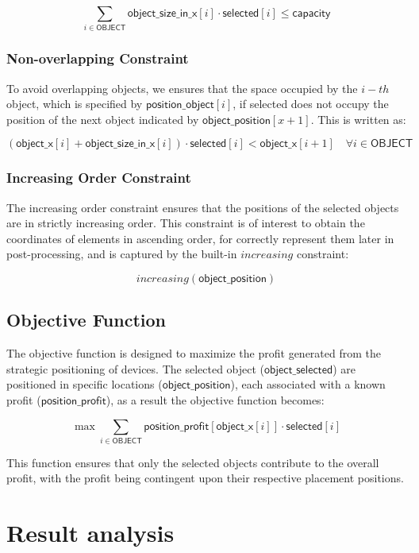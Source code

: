\documentclass[runningheads]{llncs}
\begin{document}
\[
\sum_{i \in \mathsf{OBJECT}} \mathsf{object\_size\_in\_x}[i] \cdot \mathsf{selected}[i] \leq \mathsf{capacity}
\]

\subsubsection{Non-overlapping Constraint} To avoid overlapping objects, we ensures that the space occupied by the \(i-th\) object, which is specified by \(\mathsf{position\_object}[i]\), if selected does not occupy the position of the next object indicated by \(\mathsf{object\_position}[x + 1]\). This is written as:

\[
(\mathsf{object\_x}[i] + \mathsf{object\_size\_in\_x}[i]) \cdot \mathsf{selected}[i] < \mathsf{object\_x}[i+1] \quad \forall i \in \mathsf{OBJECT}
\]

\subsubsection{Increasing Order Constraint} The increasing order constraint ensures that the positions of the selected objects are in strictly increasing order. This constraint is of interest to obtain the coordinates of elements in ascending order, for correctly represent them later in post-processing, and is captured by the built-in \(increasing\) constraint:

\[increasing(\mathsf{object\_position})\]

\subsection{Objective Function}

The objective function is designed to maximize the profit generated from the strategic positioning of devices. The selected object (\(\mathsf{object\_selected}\)) are positioned in specific locations (\(\mathsf{object\_position}\)), each associated with a known profit (\(\mathsf{position\_profit}\)), as a result the objective function becomes:

\[
\max \sum_{i \in \mathsf{OBJECT}} \mathsf{position\_profit}[\mathsf{object\_x}[i]] \cdot \mathsf{selected}[i]
\]

This function ensures that only the selected objects contribute to the overall profit, with the profit being contingent upon their respective placement positions.

\section{Result analysis}
\end{document}
